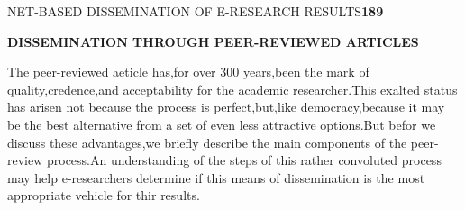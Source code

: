 \documentclass[10pt,a4paper]{book}
\begin{document}
\small

\begin{flushright}
NET-BASED DISSEMINATION OF E-RESEARCH RESULTS\quad \textbf{189}
\end{flushright}

\begin{flushleft}
\normalsize
\textbf{DISSEMINATION THROUGH PEER-REVIEWED ARTICLES}
\end{flushleft}

The peer-reviewed aeticle has,for over 300 years,been the mark of quality,credence,and acceptability for the academic researcher.This exalted status has arisen not because the process is perfect,but,like democracy,because it may be the best alternative from a set of even less attractive options.But befor we discuss these advantages,we briefly describe the main components of the peer-review process.An understanding of the steps of this rather convoluted process may help e-researchers determine if this means of dissemination is the most appropriate vehicle for thir results.
\end{document}

